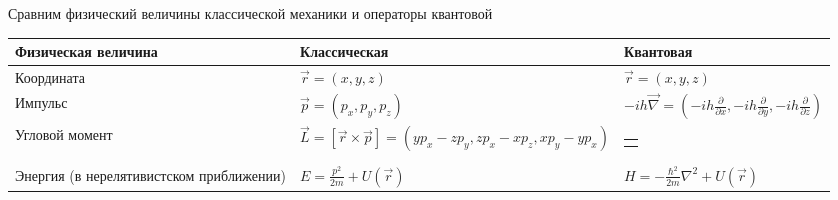 Сравним физический величины классической механики и операторы квантовой
\begin{center}
    \begin{tabularx}{\textwidth}{p{}|X|X}
        Физическая величина & Классическая & Квантовая \\
        \hline
        Координата & $\vec r = (x, y, z)$ & $\vec r = (x, y, z)$ \\
        \hline
        Импульс & $\vec p = (p_x, p_y, p_z)$ & $-ih \vec \nabla = \left(-ih \frac{\partial}{\partial x}, -ih \frac{\partial}{\partial y}, -ih \frac{\partial}{\partial z}\right)$ \\
        \hline
        Угловой момент & $\vec L = [\vec r \times \vec p] = (y p_x - z p_y, z p_x - x p_z, x p_y - y p_x)$ & 
        \begin{tabular}{@{}c@{}}$
        \hat{\vec L} = -i\hbar [\vec r \times \vec{\nabla}] = \\[3pt]
        \biggl(
          -i\hbar\!\left(y \frac{\partial}{\partial z} - z \frac{\partial}{\partial y}\right), \\[3pt]
          -i\hbar\!\left(z \frac{\partial}{\partial x} - x \frac{\partial}{\partial z}\right), \\[3pt]
          -i\hbar\!\left(x \frac{\partial}{\partial y} - y \frac{\partial}{\partial x}\right)
        \biggr)
        $ \end{tabular}\\
        \hline
        Энергия (в нерелятивистском приближении) & $E = \frac{p^2}{2m} + U(\vec r)$ & $H = -\frac{\hbar^2}{2m} \nabla^2 + U(\vec r)$


    \end{tabularx}

\end{center}

